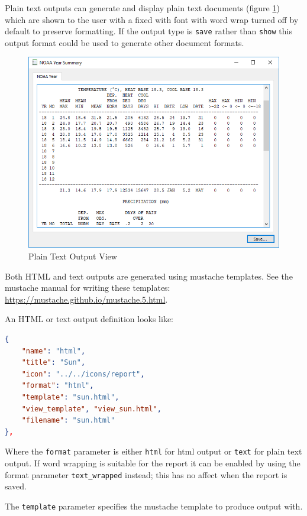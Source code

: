 \documentclass[a4paper,10pt]{book}
\begin{document}
Plain text outputs can generate and display plain text documents (figure \ref{img_text_output}) which are shown to the user with a fixed with font with word wrap turned off by default to preserve formatting. If the output type is \verb|save| rather than \verb|show| this output format could be used to generate other document formats. 

\begin {figure}[!ht]
 \centering
 \includegraphics[scale=0.5]{images/text_output}
 \caption{Plain Text Output View}
 \label{img_text_output}
\end {figure}

Both HTML and text outputs are generated using mustache templates. See the mustache manual for writing these templates: \url{https://mustache.github.io/mustache.5.html}. 

An HTML or text output definition looks like:
\begin{lstlisting}[language=json]
 {
	"name": "html",
	"title": "Sun",
	"icon": "../../icons/report",
	"format": "html",
	"template": "sun.html",
	"view_template", "view_sun.html",
	"filename": "sun.html"
},
\end{lstlisting}

Where the \verb|format| parameter is either \verb|html| for html output or \verb|text| for plain text output. If word wrapping is suitable for the report it can be enabled by using the format parameter \verb|text_wrapped| instead; this has no affect when the report is saved.

The \verb|template| parameter specifies the mustache template to produce output with. 
\end{document}
